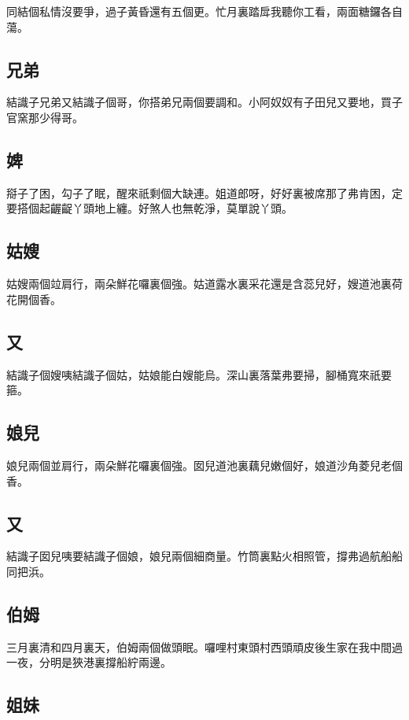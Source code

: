 同結個私情沒要爭，過子黃昏還有五個更。忙月裏踏戽我聽你工看，兩面糖鑼各自蕩。

\subsection*{兄弟}

結識子兄弟又結識子個哥，你搭弟兄兩個要調和。小阿奴奴有子田兒又要地，買子官窯那少得哥。

\subsection*{婢}

搿子了困，勾子了眠，醒來祇剩個大缺連。姐道郎呀，好好裏被席那了弗肯困，定要搭個起齷齪丫頭地上纏。好煞人也無乾淨，莫單說丫頭。

\subsection*{姑嫂}

姑嫂兩個竝肩行，兩朵鮮花囉裏個強。姑道露水裏采花還是含蕊兒好，嫂道池裏荷花開個香。

\subsection*{又}

結識子個嫂咦結識子個姑，姑娘能白嫂能烏。深山裏落葉弗要掃，腳桶寬來祇要箍。

\subsection*{娘兒}

娘兒兩個並肩行，兩朵鮮花囉裏個強。囡兒道池裏藕兒嫩個好，娘道沙角菱兒老個香。

\subsection*{又}

結識子囡兒咦要結識子個娘，娘兒兩個細商量。竹筒裏點火相照管，撐弗過航船船同把浜。

\subsection*{伯姆}

三月裏清和四月裏天，伯姆兩個做頭眠。囉哩村東頭村西頭頑皮後生家在我中間過一夜，分明是狹港裏撐船紵兩邊。

\subsection*{姐妹}

